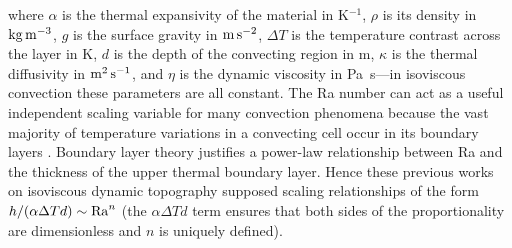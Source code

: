 where $\alpha$ is the thermal expansivity of the material in K$^{-1}$, $\rho$ is its density in ${\rm kg\,m^{-3}}$, $g$ is the surface gravity in ${\rm m\,s^{-2}}$, $\Delta T$ is the temperature contrast across the layer in K, $d$ is the depth of the convecting region in m, $\kappa$ is the thermal diffusivity in ${\rm m^2\,s^{-1}}$, and $\eta$ is the dynamic viscosity in Pa~s---in isoviscous convection these parameters are all constant. The Ra number can act as a useful independent scaling variable for many convection phenomena because the vast majority of temperature variations in a convecting cell occur in its boundary layers \citep{mckenzie_convection_1974}. Boundary layer theory justifies a power-law relationship between Ra and the thickness of the upper thermal boundary layer. Hence these previous works on isoviscous dynamic topography supposed scaling relationships of the form $h/(\alpha \Delta T d) \sim {\rm Ra}^n$ (the $\alpha \Delta T d$ term ensures that both sides of the proportionality are dimensionless and $n$ is uniquely defined). %

